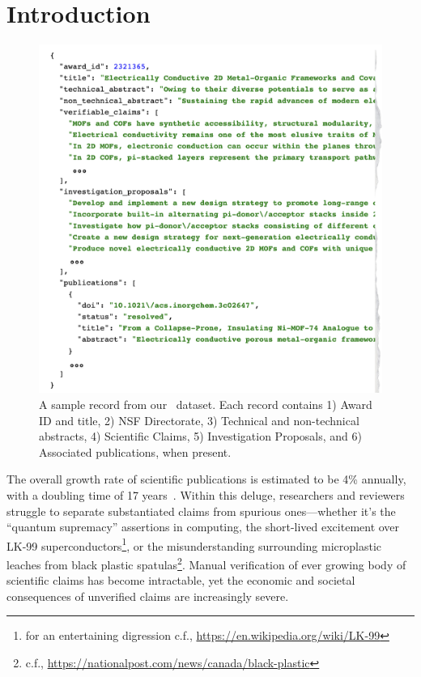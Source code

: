 \documentclass[11pt]{article}
\begin{document}
\section{Introduction}
\begin{figure}[h]
    \centering
    \includegraphics[width=1\linewidth]{images/nsf-scify-sample-record.png}
    \caption{A sample record from our \DatasetName~dataset. Each record contains 1) Award ID and title, 2) NSF Directorate, 3) Technical and non-technical abstracts, 4) Scientific Claims, 5) Investigation Proposals, and 6) Associated publications, when present.}
    \label{fig:sample-record}
\end{figure}
The overall growth rate of scientific publications is estimated to be 4\% annually, with a doubling time of 17 years~\cite{Bornmann2021}. Within this deluge, researchers and reviewers struggle to separate substantiated claims from spurious ones—whether it's the ``quantum supremacy'' assertions in computing, the short-lived excitement over LK-99 superconductors\footnote[3]{for an entertaining digression c.f., \url{https://en.wikipedia.org/wiki/LK-99}}, or the misunderstanding surrounding microplastic leaches from black plastic spatulas\footnote[4]{c.f., \url{https://nationalpost.com/news/canada/black-plastic}}. Manual verification of ever growing body of scientific claims has become intractable, yet the economic and societal consequences of unverified  claims are increasingly severe. 
\end{document}
